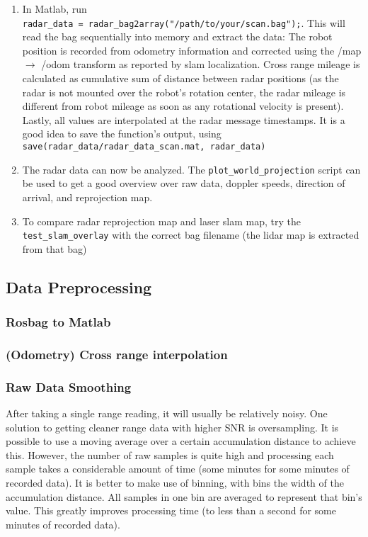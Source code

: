 \begin{enumerate}
\item
  In Matlab, run
  \texttt{radar\_data\ =\ radar\_bag2array("/path/to/your/scan.bag");}.
  This will read the bag sequentially into memory and extract the data:
  The robot position is recorded from odometry information and corrected
  using the /map \(\rightarrow\) /odom transform as reported by slam
  localization. Cross range mileage is calculated as cumulative sum of
  distance between radar positions (as the radar is not mounted over the
  robot's rotation center, the radar mileage is different from robot
  mileage as soon as any rotational velocity is present). Lastly, all
  values are interpolated at the radar message timestamps. It is a good
  idea to save the function's output, using
  \texttt{save(\textquotesingle{}radar\_data/radar\_data\_scan.mat\textquotesingle{},\ \textquotesingle{}radar\_data\textquotesingle{})}
\item
  The radar data can now be analyzed. The
  \texttt{plot\_world\_projection} script can be used to get a good
  overview over raw data, doppler speeds, direction of arrival, and
  reprojection map.
\item
  To compare radar reprojection map and laser slam map, try the
  \texttt{test\_slam\_overlay} with the correct bag filename (the lidar
  map is extracted from that bag)
\end{enumerate}

\subsection{Data Preprocessing}\label{data-preprocessing}

\subsubsection{Rosbag to Matlab}\label{rosbag-to-matlab}

\subsubsection{(Odometry) Cross range
interpolation}\label{odometry-cross-range-interpolation}

\subsubsection{Raw Data Smoothing}\label{raw-data-smoothing}

After taking a single range reading, it will usually be relatively
noisy. One solution to getting cleaner range data with higher SNR is
oversampling. It is possible to use a moving average over a certain
accumulation distance to achieve this. However, the number of raw
samples is quite high and processing each sample takes a considerable
amount of time (some minutes for some minutes of recorded data). It is
better to make use of binning, with bins the width of the accumulation
distance. All samples in one bin are averaged to represent that bin's
value. This greatly improves processing time (to less than a second for
some minutes of recorded data).

